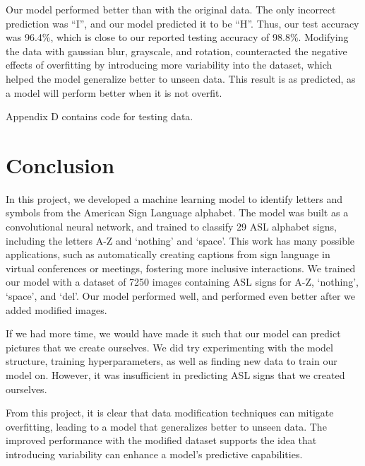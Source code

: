 \documentclass[10pt,twocolumn,letterpaper]{article}
\begin{document}
Our model performed better than with the original data. The only incorrect prediction was
“I”, and our model predicted it to be “H”. Thus, our test accuracy was 96.4\%, which is close
to our reported testing accuracy of 98.8\%. Modifying the data with gaussian blur, grayscale,
and rotation, counteracted the negative effects of overfitting by introducing more variability
into the dataset, which helped the model generalize better to unseen data. This result is as
predicted, as a model will perform better when it is not overfit. 

Appendix D contains code for testing data. 



\section{Conclusion}
In this project, we developed a machine learning model to identify letters and 
symbols from the American Sign Language alphabet. The model was built as a 
convolutional neural network, and trained to classify 29 ASL alphabet signs, 
including the letters A-Z and ‘nothing’ and ‘space’. This work has many possible
applications, such as automatically creating captions from sign language in 
virtual conferences or meetings, fostering more inclusive interactions. 
We trained our model with a dataset of 7250 images containing ASL signs for
A-Z, ‘nothing’, ‘space’, and ‘del’. Our model performed well, and performed
even better after we added modified images.  

If we had more time, we would have made it such that our model can predict pictures 
that we create ourselves. We did try experimenting with the model structure, 
training hyperparameters, as well as finding new data to train our model on. 
However, it was insufficient in predicting ASL signs that we created ourselves.

From this project, it is clear that data modification techniques can mitigate 
overfitting, leading to a model that generalizes better to unseen data. The 
improved performance with the modified dataset supports the idea that introducing
variability can enhance a model's predictive capabilities.
\end{document}
